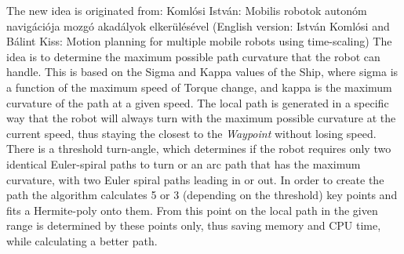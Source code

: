 The new idea is originated from: Komlósi István: Mobilis robotok autonóm navigációja mozgó akadályok elkerülésével (English version: István Komlósi and Bálint Kiss: Motion planning for multiple mobile robots using time-scaling)
The idea is to determine the maximum possible path curvature that the robot can handle. This is based on the Sigma and Kappa values of the Ship, where sigma is a function of the maximum speed of Torque change, and kappa is the maximum curvature of the path at a given speed. The local path is generated in a specific way that the robot will always turn with the maximum possible curvature at the current speed, thus staying the closest to the \emph{Waypoint} without losing speed. There is a threshold turn-angle, which determines if the robot requires only two identical Euler-spiral paths to turn or an arc path that has the maximum curvature, with two Euler spiral paths leading in or out.
In order to create the path the algorithm calculates 5 or 3 (depending on the threshold) key points and fits a Hermite-poly onto them. From this point on the local path in the given range is determined by these points only, thus saving memory and CPU time, while calculating a better path.

